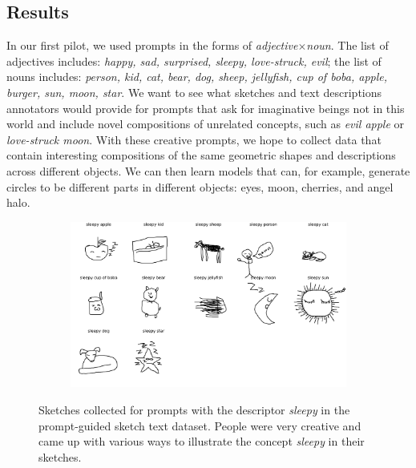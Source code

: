 
\subsection{Results}
In our first pilot, we used prompts in the forms of \textit{adjective}$\times$\textit{noun}. 
The list of adjectives includes: \textit{happy, sad, surprised, sleepy, love-struck, evil}; the list of nouns includes: 
\textit{person, kid, cat, bear, dog, sheep, jellyfish, cup of boba, apple, burger, sun, moon, star}. 
We want to see what sketches and text descriptions annotators would provide for prompts that ask for imaginative beings not in this world and include novel compositions of unrelated concepts, such as \textit{evil apple} or \textit{love-struck moon}. 
With these creative prompts, we hope to collect data that contain interesting compositions of the same geometric shapes and descriptions across different objects. 
We can then learn models that can, for example, generate circles to be different parts in different objects: eyes, moon, cherries, and angel halo. 

\begin{figure}[!htb]
\begin{subfigure}{\textwidth}
\centering
\includegraphics[width=\linewidth]{data_collection/v1_sleepy_sketches.png}  
\end{subfigure}
\caption{Sketches collected for prompts with the descriptor \textit{sleepy} in the prompt-guided sketch text dataset. People were very creative and came up with various ways to illustrate the concept \textit{sleepy} in their sketches.}
\label{v1.sleepy}
\end{figure}

